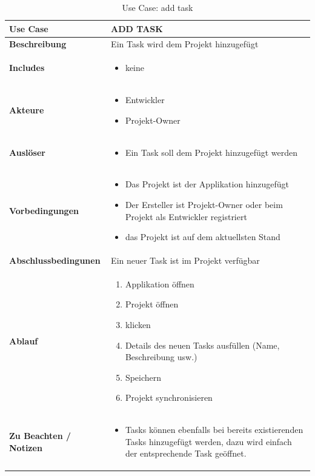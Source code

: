   \begin{table}[H]
    \centering
    \settowidth{}
    \setlength\extrarowheight{2pt}
    \begin{tabulary}{1.0\textwidth}{|m{4cm}|m{9cm}|}
      \hline
      \textbf{Use Case} &
      \textbf{ADD TASK}\\
      \hline
      \textbf{Beschreibung} &
      Ein Task wird dem Projekt hinzugefügt\\ 
      \hline
      \textbf{Includes} &
      \begin{itemize}
       \item keine
        \end{itemize}\\ 
        \hline 
      \textbf{Akteure} &
      \begin{itemize}
       \item Entwickler
       \item Projekt-Owner
        \end{itemize}\\  
        \hline
      \textbf{Auslöser} &
      \begin{itemize}
        \item Ein Task soll dem Projekt hinzugefügt werden
         \end{itemize}\\  
      \hline
      \textbf{Vorbedingungen} &
      \begin{itemize}
        \item Das Projekt ist der Applikation hinzugefügt
        \item Der Ersteller ist Projekt-Owner oder beim Projekt als Entwickler registriert
        \item das Projekt ist auf dem aktuellsten Stand
      \end{itemize}\\  
      \hline
      \textbf{Abschlussbedingunen} &
      Ein neuer Task ist im Projekt verfügbar\\
      \hline
      \textbf{Ablauf} &
      \begin{enumerate}
        \item Applikation öffnen
        \item Projekt öffnen
        \item <Task hinzufügen> klicken
        \item Details des neuen Tasks ausfüllen (Name, Beschreibung usw.)
        \item Speichern
        \item Projekt synchronisieren
        \end{enumerate}\\ 
      \hline
      \textbf{Zu Beachten / Notizen} &
      \begin{itemize}
        \item Tasks können ebenfalls bei bereits existierenden Tasks hinzugefügt werden, dazu wird einfach der entsprechende Task geöffnet.
        \end{itemize}\\ 
      \hline
    \end{tabulary}
    \caption{Use Case: add task}
  \end{table}
 